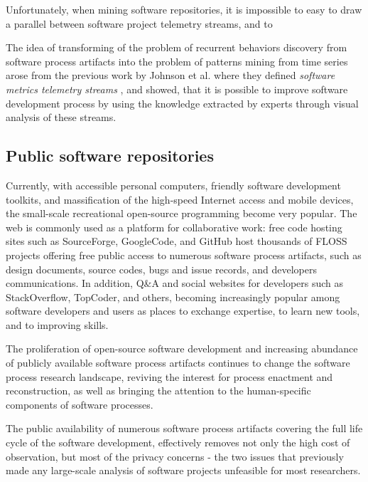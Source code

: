 Unfortunately, when mining software repositories, it is impossible to easy to draw a parallel between software project telemetry streams, and to 

The idea of transforming of the problem of recurrent behaviors discovery from software process artifacts into 
the problem of patterns mining from time series arose from the previous work by Johnson et al. 
where they defined \textit{software metrics telemetry streams} \cite{citeulike:557296}, 
and showed, that it is possible to improve software development process by using the knowledge extracted by 
experts through visual analysis of these streams.

\subsection{Public software repositories}
Currently, with accessible personal computers, friendly software development toolkits, and massification of 
the high-speed Internet access and mobile devices, the small-scale recreational open-source programming 
become very popular. 
The web is commonly used as a platform for collaborative work: free code hosting sites such as SourceForge, 
GoogleCode, and GitHub host thousands of FLOSS projects offering free public access to numerous software 
process artifacts, such as design documents, source codes, bugs and issue records, and developers communications.
In addition, Q\&A and social websites for developers such as StackOverflow, TopCoder, and others, becoming 
increasingly popular among software developers and users as places to exchange expertise, to learn new tools, 
and to improving skills.

The proliferation of open-source software development and increasing abundance of publicly available 
software process artifacts continues to change the software process research landscape,
reviving the interest for process enactment and reconstruction, as well as bringing the attention to the 
human-specific components of software processes. 


The public availability of numerous software process artifacts covering the full life cycle of the software
development, effectively removes not only the high cost of observation, but most of the privacy concerns - 
the two issues that previously made any large-scale analysis of software projects unfeasible for most researchers.

